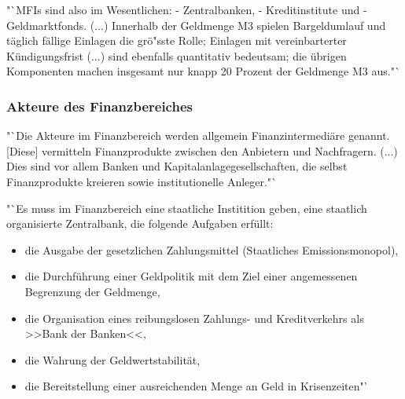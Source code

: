 \documentclass[
        onecolumn,
        a4paper,
        abstracton,
        parskip=half
        ,final
        ]{scrartcl}
\begin{document}
    \citep*[vgl.][S.508]{Basseler2010} "`MFIs sind also im Wesentlichen:
    - Zentralbanken,
    - Kreditinstitute und
    - Geldmarktfonds.
    (...) Innerhalb der Geldmenge M3 spielen Bargeldumlauf und t{\"a}glich f{\"a}llige Einlagen die gr{\"o}{"ss}te Rolle; Einlagen mit vereinbarterter K{\"u}ndigungsfrist (...) sind ebenfalls quantitativ bedeutsam; die {\"u}brigen Komponenten machen insgesamt nur knapp 20 Prozent der Geldmenge M3 aus."`


    \subsubsection{ Akteure des Finanzbereiches}
    \citep*[vgl.][S.511f]{Basseler2010} "`Die Akteure im Finanzbereich werden allgemein Finanzintermedi{\"a}re genannt. [Diese] vermitteln Finanzprodukte zwischen den Anbietern und Nachfragern. (...) Dies sind vor allem Banken und Kapitalanlagegesellschaften, die selbst Finanzprodukte kreieren sowie institutionelle Anleger."`

     "`Es muss im Finanzbereich eine staatliche Institition geben, eine staatlich organisierte Zentralbank, die folgende Aufgaben erf{\"u}llt:
     \begin{itemize}
    \item{die Ausgabe der gesetzlichen Zahlungsmittel (Staatliches Emissionsmonopol),}
    \item{die Durchf{\"u}hrung einer Geldpolitik mit dem Ziel einer angemessenen Begrenzung der Geldmenge,}
    \item{die Organisation eines reibungslosen Zahlungs- und Kreditverkehrs als >>Bank der Banken<<,}
    \item{die Wahrung der Geldwertstabilit{\"a}t,}
    \item{die Bereitstellung einer ausreichenden Menge an Geld in Krisenzeiten"'}
    \end{itemize}
\end{document}
